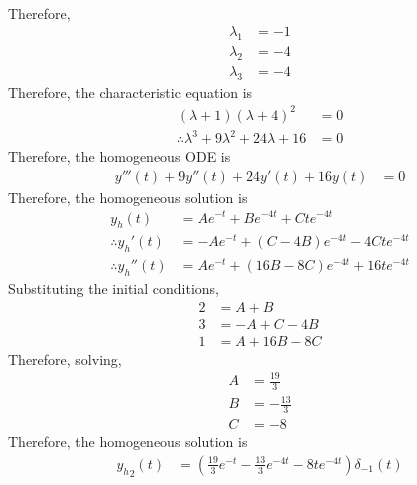 \documentclass[fleqn, a4paper, 11pt, oneside]{amsart}
\theoremstyle{definition}
\theoremstyle{theorem}
\begin{document}
\begin{solution}
\begin{enumerate}[leftmargin=*]
\begin{align*}
			\end{align*}
			Therefore,
			\begin{align*}
				\lambda_1 & = -1 \\
				\lambda_2 & = -4 \\
				\lambda_3 & = -4
			\end{align*}
			Therefore, the characteristic equation is
			\begin{align*}
				(\lambda + 1) (\lambda + 4)^2                        & = 0 \\
				\therefore \lambda^3 + 9 \lambda^2 + 24 \lambda + 16 & = 0
			\end{align*}
			Therefore, the homogeneous ODE is
			\begin{align*}
				y'''(t) + 9 y''(t) + 24 y'(t) + 16 y(t) & = 0
			\end{align*}
			Therefore, the homogeneous solution is
			\begin{align*}
				y_h(t)                & = A e^{-t} + B e^{-4 t} + C t e^{-4 t}            \\
				\therefore {y_h}'(t)  & = -A e^{-t} + (C - 4 B) e^{-4 t} - 4 C t e^{-4 t} \\
				\therefore {y_h}''(t) & = A e^{-t} + (16 B - 8 C) e^{-4 t} + 16 t e^{-4 t}
			\end{align*}
			Substituting the initial conditions,
			\begin{align*}
				2 & = A + B        \\
				3 & = -A + C - 4 B \\
				1 & = A + 16 B - 8 C
			\end{align*}
			Therefore, solving,
			\begin{align*}
				A & = \frac{19}{3}  \\
				B & = -\frac{13}{3} \\
				C & = -8
			\end{align*}
			Therefore, the homogeneous solution is
			\begin{align*}
				{y_h}_2(t) & = \left( \frac{19}{3} e^{-t} - \frac{13}{3} e^{-4 t} - 8 t e^{-4 t} \right) \delta_{-1}(t)
			\end{align*}
	\end{enumerate}
\end{solution}
\end{document}
